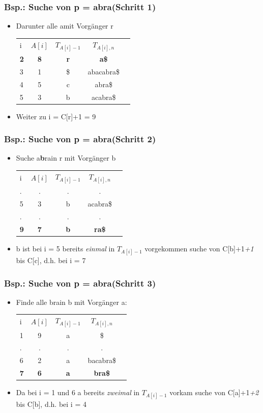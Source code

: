\documentclass{beamer}
\begin{document}
\begin{frame}
\frametitle{Bsp.: Suche von p = \glqq abra\grqq (Schritt 1)}
\begin{itemize}
\item Darunter alle \glqq a\grqq mit Vorgänger \glqq r\grqq
\begin{tabular}{l c cc r}
i & $A[i]$ & $T_{A[i]-1}$ & $T_{A[i],n}$\\
\textbf{2} & \textbf{8} & \color{red}\textbf{r} & \textbf{a\$} \\
3 & 1 & \$ & abacabra\$ \\
4 & 5 & c & abra\$ \\
5 & 3 & b & acabra\$ \\
\end{tabular}
\item Weiter zu i = C[\glqq r\grqq]+1 = 9
\end{itemize}
\end{frame}
\begin{frame}
\frametitle{Bsp.: Suche von p = \glqq abra\grqq (Schritt 2)}
\begin{itemize}
\item Suche \glqq a\color{red}\textbf{b}\color{black}ra\grqq in r mit Vorgänger b
\begin{tabular}{l c cc r}
i & $A[i]$ & $T_{A[i]-1}$ & $T_{A[i],n}$\\
. & . & . & .\\
5 & 3 & b & acabra\$ \\
. & . & . & .\\
\textbf{9} & \textbf{7} & \color{red}\textbf{b} & \textbf{ra\$} \\
\end{tabular}
\item b ist bei i = 5 bereits \textit{einmal} in $T_{A[i]-1}$ vorgekommen \textrightarrow suche von C[\glqq b\grqq]+1\textit{+1} bis C[\glqq c\grqq], d.h. bei i = 7
\end{itemize}
\end{frame}
\begin{frame}
\frametitle{Bsp.: Suche von p = \glqq abra\grqq (Schritt 3)}
\begin{itemize}
\item Finde alle bra\grqq  in b mit Vorgänger \glqq a\grqq:
\begin{tabular}{l c cc r}
i & $A[i]$ & $T_{A[i]-1}$ & $T_{A[i],n}$\\
1 & 9 & a & \$ \\
. & . & . & .\\
6 & 2 & a & bacabra\$ \\
\textbf{7} & \textbf{6}  & \color{red}\textbf{a} & \textbf{bra\$} \\
\end{tabular}
\item Da bei i = 1 und 6 a bereits \textit{zweimal} in $T_{A[i]-1}$ vorkam \textrightarrow suche von C[\glqq a\grqq]+1\textit{+2} bis C[\glqq b\grqq], d.h. bei i = 4
\end{itemize}
\end{frame}
\end{document}
